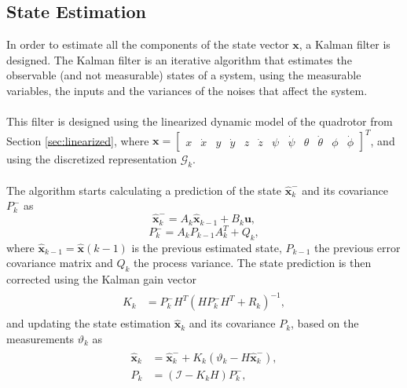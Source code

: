 \subsection{State Estimation}
In order to estimate all the components of the state vector $\mathbf{x}$, a Kalman filter is designed. The Kalman filter is an iterative algorithm that estimates the observable (and not measurable) states of a system, using the measurable variables, the inputs and the variances of the noises that affect the system.
\\\\
This filter is designed using the linearized dynamic model of the quadrotor from Section \ref{sec:linearized}, where $\mathbf{x} =  \begin{bmatrix}
x & \dot{x} & y & \dot{y} & z & \dot{z} & \psi & \dot{\psi} & \theta & \dot{\theta} & \phi & \dot{\phi}
\end{bmatrix}^{T}$, and using the discretized representation $\mathcal{G}_k$.
\\\\
The algorithm starts calculating a prediction of the state $\hat{\mathbf{x}}_{k}^{-}$ and its covariance $P_{k}^{-}$ as
\begin{equation}\label{eqn:statePrognosis}
\hat{\mathbf{x}}_{k}^{-} = A_k\hat{\mathbf{x}}_{k-1}+B_k\mathbf{u},
\end{equation}
\begin{equation}\label{eqn:covariancePrognosis}
P_{k}^{-} = A_k P_{k-1} A_{k}^{T} + Q_{k},
\end{equation}
where $\hat{\mathbf{x}}_{k-1} = \hat{\mathbf{x}}(k-1)$ is the previous estimated state, $P_{k-1}$ the previous error covariance matrix and $Q_{k}$ the process variance. The state prediction is then corrected using the Kalman gain vector
\begin{align}\label{eqn:correctionKalman}
\begin{split}
K_{k} &= P^{-}_{k}H^{T}(HP^{-}_{k}H^{T} + R_k)^{-1},
\end{split}
\end{align}
and updating the state estimation $\hat{\mathbf{x}}_{k}$ and its covariance $P_{k}$, based on the measurements $\vartheta_k$ as
\begin{align}\label{eqn:correctionKalman2}
\begin{split}
\hat{\mathbf{x}}_{k} &= \hat{\mathbf{x}}^{-}_{k} + K_{k}(\vartheta_{k} - H\hat{\mathbf{x}}^{-}_{k}),\\
P_{k} &= (\mathcal{I} - K_{k}H)P^{-}_{k},
\end{split}
\end{align}
